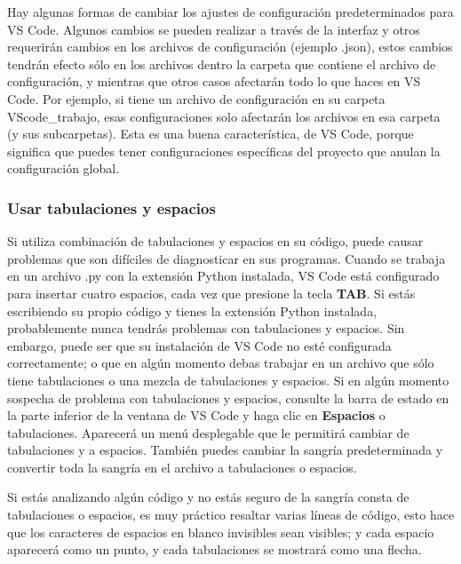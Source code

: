 
Hay algunas formas de cambiar los ajustes de configuración predeterminados para VS Code. Algunos cambios se pueden 
realizar a través de la interfaz y otros requerirán cambios en los archivos de configuración (ejemplo .json), estos  cambios 
tendrán efecto  sólo en los archivos dentro la carpeta que contiene el archivo de configuración, y  mientras  que  otros casos  afectarán  todo lo que haces en VS Code.  Por ejemplo, si tiene un archivo de configuración en su carpeta {\ttfamily VScode\_trabajo},
esas configuraciones solo afectarán los archivos en esa carpeta (y sus subcarpetas). Esta es una buena característica,
de VS Code, porque significa que puedes tener configuraciones  específicas del proyecto que anulan la configuración global.

\subsubsection{Usar tabulaciones y espacios}\label{Tab}

Si utiliza  combinación de tabulaciones y espacios en su código, puede causar problemas que son difíciles de diagnosticar  en
sus programas. Cuando se trabaja en un archivo .py con la extensión Python instalada, VS Code está configurado para insertar cuatro espacios,
cada vez que presione la tecla {\bf{TAB}}. Si estás escribiendo  su propio código y
tienes la extensión Python instalada, probablemente nunca tendrás problemas con tabulaciones y espacios.
Sin embargo, puede ser que su instalación de VS Code no esté configurada correctamente; o que en algún momento debas  trabajar en un archivo que sólo tiene tabulaciones o una mezcla de  tabulaciones y espacios. Si en algún momento sospecha de problema con 
tabulaciones y espacios, consulte la barra de estado en la parte inferior de la ventana de VS Code y haga clic en {\bf{Espacios}}  o  tabulaciones. Aparecerá un menú desplegable que le permitirá cambiar de tabulaciones y a espacios.  También puedes cambiar la sangría predeterminada y convertir toda la sangría en el archivo a tabulaciones o espacios.

Si estás analizando algún código y no estás seguro de la sangría consta de tabulaciones o espacios, es muy práctico resaltar varias
líneas de código,  esto hace que los caracteres de espacios en blanco invisibles sean visibles; y cada espacio aparecerá
como un punto, y cada tabulaciones se mostrará como una flecha.\\



